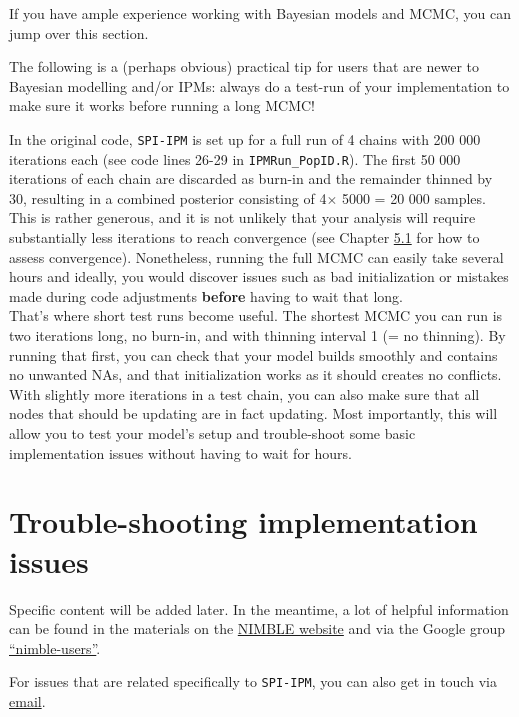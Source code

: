 \documentclass[
]{book}
\begin{document}
If you have ample experience working with Bayesian models and MCMC, you can jump
over this section.

The following is a (perhaps obvious) practical tip for users that are newer to
Bayesian modelling and/or IPMs: always do a test-run of your implementation to
make sure it works before running a long MCMC!

In the original code, \texttt{SPI-IPM} is set up for a full run of 4 chains with
200 000 iterations each (see code lines 26-29 in \texttt{IPMRun\_PopID.R}). The first
50 000 iterations of each chain are discarded as burn-in and the remainder
thinned by 30, resulting in a combined posterior consisting of 4\(\times\) 5000 = 20 000
samples. This is rather generous, and it is not unlikely that your analysis will
require substantially less iterations to reach convergence (see Chapter
\protect\hyperlink{ux5cux23ux5cux2520Assessingux5cux2520chainux5cux2520convergence}{5.1} for how to assess convergence).
Nonetheless, running the full MCMC can easily take several hours and ideally,
you would discover issues such as bad initialization or mistakes made during
code adjustments \textbf{before} having to wait that long.\\
That's where short test runs become useful. The shortest MCMC you can run is
two iterations long, no burn-in, and with thinning interval 1 (= no thinning).
By running that first, you can check that your model builds smoothly and contains
no unwanted NAs, and that initialization works as it should creates no conflicts.
With slightly more iterations in a test chain, you can also make sure that all
nodes that should be updating are in fact updating. Most importantly, this will
allow you to test your model's setup and trouble-shoot some basic implementation
issues without having to wait for hours.

\hypertarget{trouble-shooting-implementation-issues}{%
\section{Trouble-shooting implementation issues}\label{trouble-shooting-implementation-issues}}

Specific content will be added later. In the meantime, a lot of helpful
information can be found in the materials on the \href{https://r-nimble.org/}{NIMBLE website}
and via the Google group \href{https://groups.google.com/g/nimble-users}{``nimble-users''}.

For issues that are related specifically to \texttt{SPI-IPM}, you can also get in touch
via \href{mailto:chloe.nater@nina.no}{email}.
\end{document}

